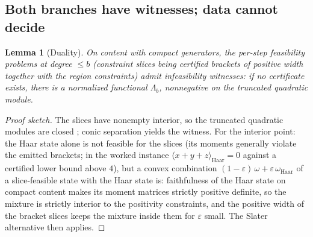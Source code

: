 \documentclass[11pt]{article}
\newtheorem{lemma}[theorem]{Lemma}
\theoremstyle{definition}
\theoremstyle{remark}
\begin{document}
\subsection{Both branches have witnesses; data cannot decide}
\begin{lemma}[Duality]\label{lem:duality}
On content with compact generators, the per-step feasibility problems at
degree $\le b$ (constraint slices being certified brackets of positive
width together with the region constraints) admit infeasibility
witnesses: if no certificate exists, there is a normalized functional
$\Lambda_b$, nonnegative on the truncated quadratic module.
\end{lemma}
\begin{proof}[Proof sketch]
The slices have nonempty interior, so the truncated quadratic modules
are closed \cite{powers,marshall}; conic separation yields the witness.
For the interior point: the Haar state alone is not feasible for the
slices (its moments generally violate the emitted brackets; in the
worked instance $\langle x{+}y{+}z\rangle_{\mathrm{Haar}} = 0$ against
a certified lower bound above $4$), but a convex combination
$(1-\varepsilon)\,\omega + \varepsilon\,\omega_{\mathrm{Haar}}$ of a
slice-feasible state with the Haar state is: faithfulness of the Haar
state on compact content makes its moment matrices strictly positive
definite, so the mixture is strictly interior to the positivity
constraints, and the positive width of the bracket slices keeps the
mixture inside them for $\varepsilon$ small.  The Slater alternative
then applies.
\end{proof}
\end{document}
